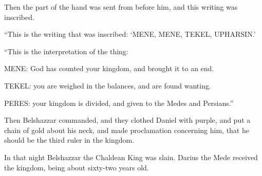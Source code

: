 {Then the part of the hand was sent from before him, and this writing was inscribed.
\par }{\PP {}“This is the writing that was inscribed: ‘MENE, MENE, TEKEL, UPHARSIN.’
\par }{\PP {}“This is the interpretation of the thing:
\par }{\MM MENE: God has counted your kingdom, and brought it to an end.
\par }{\MM {}TEKEL: you are weighed in the balances, and are found wanting.
\par }{\MM {}PERES: your kingdom is divided, and given to the Medes and Persians.”
\par }{\PP {}Then Belshazzar commanded, and they clothed Daniel with purple, and put a chain of gold about his neck, and made proclamation concerning him, that he should be the third ruler in the kingdom.
\par }{\PP {}In that night Belshazzar the Chaldean King was slain.
Darius the Mede received the kingdom, being about sixty-two years old.

}
